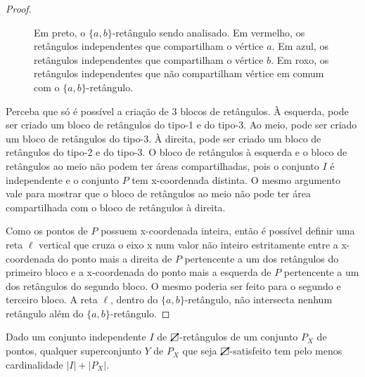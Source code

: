 \begin{proof}
\begin{figure}
    \caption{Em preto, o $\{a,b\}$-retângulo sendo analisado. Em vermelho, os retângulos independentes que compartilham o vértice $a$. Em azul, os retângulos independentes que compartilham o vértice $b$. Em roxo, os retângulos independentes que não compartilham vértice em comum com o $\{a,b\}$-retângulo.}
\label{fig:retangulo_wider}
\end{figure}

    Perceba que só é possível a criação de 3 blocos de retângulos. À esquerda, pode ser criado um bloco de retângulos do tipo-1 e do tipo-3. Ao meio, pode ser criado um bloco de retângulos do tipo-3. À direita, pode ser criado um bloco de retângulos do tipo-2 e do tipo-3. O bloco de retângulos à esquerda e o bloco de retângulos ao meio não podem ter áreas compartilhadas, pois o conjunto $I$ é independente e o conjunto $P$ tem x-coordenada distinta. O mesmo argumento vale para mostrar que o bloco de retângulos ao meio não pode ter área compartilhada com o bloco de retângulos à direita.

    Como os pontos de $P$ possuem x-coordenada inteira, então é possível definir uma reta $\ell$ vertical que cruza o eixo x num valor não inteiro estritamente entre a x-coordenada do ponto mais a direita de $P$ pertencente a um dos retângulos do primeiro bloco e a x-coordenada do ponto mais a esquerda de $P$ pertencente a um dos retângulos do segundo bloco. O mesmo poderia ser feito para o segundo e terceiro bloco. A reta $\ell$, dentro do $\{a,b\}$-retângulo, não intersecta nenhum retângulo além do $\{a,b\}$-retângulo.
\end{proof}


\begin{lemma} \label{lema_6.4}
    Dado um conjunto independente $I$ de $\rectpos$-retângulos de um conjunto $P_X$ de pontos, qualquer superconjunto $Y$ de $P_X$ que seja $\rectpos$-satisfeito tem pelo menos cardinalidade $|I| + |P_X|$. 
\end{lemma}


